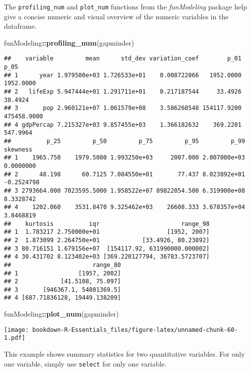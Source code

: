 \documentclass[]{book}
\newenvironment{Shaded}{\begin{snugshade}}{\end{snugshade}}
\newcommand{\KeywordTok}[1]{\textcolor[rgb]{0.13,0.29,0.53}{\textbf{#1}}}
\newcommand{\OperatorTok}[1]{\textcolor[rgb]{0.81,0.36,0.00}{\textbf{#1}}}
\newcommand{\NormalTok}[1]{#1}
\begin{document}
The \texttt{profiling\_num} and \texttt{plot\_num} functions from the
\emph{funModeling} package help give a concise numeric and visual
overview of the numeric variables in the dataframe.

\begin{Shaded}
\begin{Highlighting}[]
\NormalTok{funModeling}\OperatorTok{::}\KeywordTok{profiling_num}\NormalTok{(gapminder)}
\end{Highlighting}
\end{Shaded}

\begin{verbatim}
##    variable         mean      std_dev variation_coef        p_01        p_05
## 1      year 1.979500e+03 1.726533e+01    0.008722066   1952.0000   1952.0000
## 2   lifeExp 5.947444e+01 1.291711e+01    0.217187544     33.4926     38.4924
## 3       pop 2.960121e+07 1.061579e+08    3.586268548 154117.9200 475458.9000
## 4 gdpPercap 7.215327e+03 9.857455e+03    1.366182632    369.2201    547.9964
##          p_25         p_50         p_75         p_95         p_99   skewness
## 1    1965.750    1979.5000 1.993250e+03     2007.000 2.007000e+03  0.0000000
## 2      48.198      60.7125 7.084550e+01       77.437 8.023892e+01 -0.2524798
## 3 2793664.000 7023595.5000 1.958522e+07 89822054.500 6.319900e+08  8.3328742
## 4    1202.060    3531.8470 9.325462e+03    26608.333 3.678357e+04  3.8468819
##    kurtosis          iqr                       range_98
## 1  1.783217 2.750000e+01                   [1952, 2007]
## 2  1.873099 2.264750e+01            [33.4926, 80.23892]
## 3 80.716151 1.679156e+07  [154117.92, 631990000.000002]
## 4 30.431702 8.123402e+03 [369.220127794, 36783.5723707]
##                       range_80
## 1                 [1957, 2002]
## 2            [41.5108, 75.097]
## 3       [946367.1, 54801369.5]
## 4 [687.71836128, 19449.138209]
\end{verbatim}

\begin{Shaded}
\begin{Highlighting}[]
\NormalTok{funModeling}\OperatorTok{::}\KeywordTok{plot_num}\NormalTok{(gapminder)}
\end{Highlighting}
\end{Shaded}

\texttt{[image: bookdown-R-Essentials\_files/figure-latex/unnamed-chunk-60-1.pdf]}

This example shows summary statistics for two quantitative variables.
For only one variable, simply use \texttt{select} for only one variable.
\end{document}
